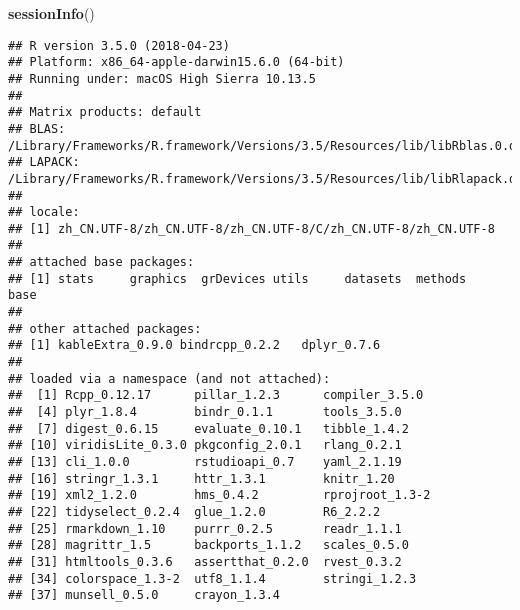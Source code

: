 \documentclass[]{article}
\newenvironment{Shaded}{\begin{snugshade}}{\end{snugshade}}
\newcommand{\KeywordTok}[1]{\textcolor[rgb]{0.13,0.29,0.53}{\textbf{#1}}}
\newcommand{\NormalTok}[1]{#1}
\begin{document}
\newpage

\begin{Shaded}
\begin{Highlighting}[]
\KeywordTok{sessionInfo}\NormalTok{()}
\end{Highlighting}
\end{Shaded}

\begin{verbatim}
## R version 3.5.0 (2018-04-23)
## Platform: x86_64-apple-darwin15.6.0 (64-bit)
## Running under: macOS High Sierra 10.13.5
## 
## Matrix products: default
## BLAS: /Library/Frameworks/R.framework/Versions/3.5/Resources/lib/libRblas.0.dylib
## LAPACK: /Library/Frameworks/R.framework/Versions/3.5/Resources/lib/libRlapack.dylib
## 
## locale:
## [1] zh_CN.UTF-8/zh_CN.UTF-8/zh_CN.UTF-8/C/zh_CN.UTF-8/zh_CN.UTF-8
## 
## attached base packages:
## [1] stats     graphics  grDevices utils     datasets  methods   base     
## 
## other attached packages:
## [1] kableExtra_0.9.0 bindrcpp_0.2.2   dplyr_0.7.6     
## 
## loaded via a namespace (and not attached):
##  [1] Rcpp_0.12.17      pillar_1.2.3      compiler_3.5.0   
##  [4] plyr_1.8.4        bindr_0.1.1       tools_3.5.0      
##  [7] digest_0.6.15     evaluate_0.10.1   tibble_1.4.2     
## [10] viridisLite_0.3.0 pkgconfig_2.0.1   rlang_0.2.1      
## [13] cli_1.0.0         rstudioapi_0.7    yaml_2.1.19      
## [16] stringr_1.3.1     httr_1.3.1        knitr_1.20       
## [19] xml2_1.2.0        hms_0.4.2         rprojroot_1.3-2  
## [22] tidyselect_0.2.4  glue_1.2.0        R6_2.2.2         
## [25] rmarkdown_1.10    purrr_0.2.5       readr_1.1.1      
## [28] magrittr_1.5      backports_1.1.2   scales_0.5.0     
## [31] htmltools_0.3.6   assertthat_0.2.0  rvest_0.3.2      
## [34] colorspace_1.3-2  utf8_1.1.4        stringi_1.2.3    
## [37] munsell_0.5.0     crayon_1.3.4
\end{verbatim}
\end{document}
